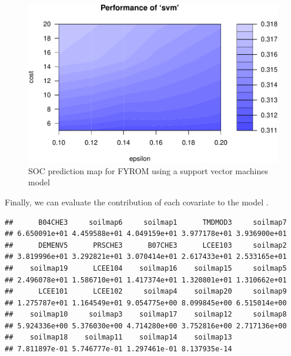 \documentclass[10pt,b5paper,]{book}
\newenvironment{Shaded}{\begin{snugshade}}{\end{snugshade}}
\newcommand{\CommentTok}[1]{\textcolor[rgb]{0.56,0.35,0.01}{\textit{#1}}}
\newcommand{\ControlFlowTok}[1]{\textcolor[rgb]{0.13,0.29,0.53}{\textbf{#1}}}
\newcommand{\DataTypeTok}[1]{\textcolor[rgb]{0.13,0.29,0.53}{#1}}
\newcommand{\DecValTok}[1]{\textcolor[rgb]{0.00,0.00,0.81}{#1}}
\newcommand{\KeywordTok}[1]{\textcolor[rgb]{0.13,0.29,0.53}{\textbf{#1}}}
\newcommand{\NormalTok}[1]{#1}
\newcommand{\OperatorTok}[1]{\textcolor[rgb]{0.81,0.36,0.00}{\textbf{#1}}}
\newcommand{\StringTok}[1]{\textcolor[rgb]{0.31,0.60,0.02}{#1}}
\theoremstyle{definition}
\theoremstyle{definition}
\theoremstyle{definition}
\theoremstyle{remark}
\begin{document}
\begin{figure}
\centering
\includegraphics{SOCMapping_files/figure-latex/unnamed-chunk-82-1.pdf}
\caption{\label{fig:unnamed-chunk-82}SOC prediction map for FYROM using a
support vector machines model}
\end{figure}

Finally, we can evaluate the contribution of each covariate to the model
\citep{guyon2003introduction}.

\begin{Shaded}
\end{Shaded}

\begin{verbatim}
##      B04CHE3     soilmap6     soilmap1      TMDMOD3     soilmap7 
## 6.650091e+01 4.459588e+01 4.049159e+01 3.977178e+01 3.936900e+01 
##      DEMENV5      PRSCHE3      B07CHE3      LCEE103     soilmap2 
## 3.819996e+01 3.292821e+01 3.070414e+01 2.617433e+01 2.533165e+01 
##    soilmap19      LCEE104    soilmap16    soilmap15     soilmap5 
## 2.496078e+01 1.586710e+01 1.417374e+01 1.320801e+01 1.310662e+01 
##      LCEE101      LCEE102     soilmap4    soilmap20     soilmap9 
## 1.275787e+01 1.164549e+01 9.054775e+00 8.099845e+00 6.515014e+00 
##    soilmap10     soilmap3    soilmap17    soilmap12     soilmap8 
## 5.924336e+00 5.376030e+00 4.714280e+00 3.752816e+00 2.717136e+00 
##    soilmap18    soilmap11    soilmap14    soilmap13 
## 7.811897e-01 5.746777e-01 1.297461e-01 8.137935e-14
\end{verbatim}
\end{document}
